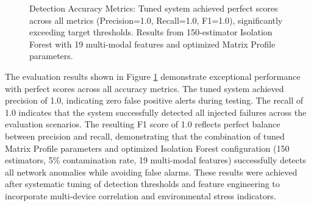 \documentclass[11pt]{article}
\begin{document}
\begin{figure}[h]
\centering
{}
\caption{Detection Accuracy Metrics: Tuned system achieved perfect scores across all metrics (Precision=1.0, Recall=1.0, F1=1.0), significantly exceeding target thresholds. Results from 150-estimator Isolation Forest with 19 multi-modal features and optimized Matrix Profile parameters.}
\label{fig:metrics}
\end{figure}

The evaluation results shown in Figure \ref{fig:metrics} demonstrate exceptional performance with perfect scores across all accuracy metrics. The tuned system achieved precision of 1.0, indicating zero false positive alerts during testing. The recall of 1.0 indicates that the system successfully detected all injected failures across the evaluation scenarios. The resulting F1 score of 1.0 reflects perfect balance between precision and recall, demonstrating that the combination of tuned Matrix Profile parameters and optimized Isolation Forest configuration (150 estimators, 5\% contamination rate, 19 multi-modal features) successfully detects all network anomalies while avoiding false alarms. These results were achieved after systematic tuning of detection thresholds and feature engineering to incorporate multi-device correlation and environmental stress indicators.
\end{document}
